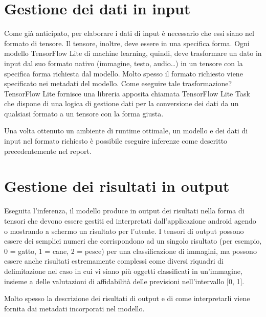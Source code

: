 \newpage
\section{Gestione dei dati in input}
Come già anticipato, per elaborare i dati di input è necessario che essi siano nel formato di tensore. Il tensore, inoltre, deve essere in una specifica forma. Ogni modello TensorFlow Lite di machine learning, quindi, deve trasformare
un dato in input dal suo formato nativo (immagine, testo, audio…) in un tensore con la specifica forma richiesta dal modello. Molto spesso il formato richiesto viene specificato nei metadati del modello. Come eseguire tale trasformazione?
TensorFlow Lite fornisce una libreria apposita chiamata TensorFlow Lite Task che dispone di una logica di gestione dati per la conversione dei dati da un qualsiasi formato a un tensore con la forma giusta.

Una volta ottenuto un ambiente di runtime ottimale, un modello e dei dati di input nel formato richiesto è possibile eseguire inferenze come descritto precedentemente nel report.

\section{Gestione dei risultati in output}
Eseguita l’inferenza, il modello produce in output dei risultati nella forma di tensori che devono essere gestiti ed interpretati dall’applicazione android agendo o mostrando a schermo un risultato per l’utente. 
I tensori di output possono essere dei semplici numeri che corrispondono ad un singolo risultato (per esempio, 0 = gatto, 1 = cane, 2 = pesce) per una classificazione di immagini, ma possono essere anche risultati estremamente
complessi come diversi riquadri di delimitazione nel caso in cui vi siano più oggetti classificati in un’immagine, insieme a delle valutazioni di affidabilità delle previsioni nell’intervallo [0, 1].

Molto spesso la descrizione dei risultati di output e di come interpretarli viene fornita dai metadati incorporati nel modello.

